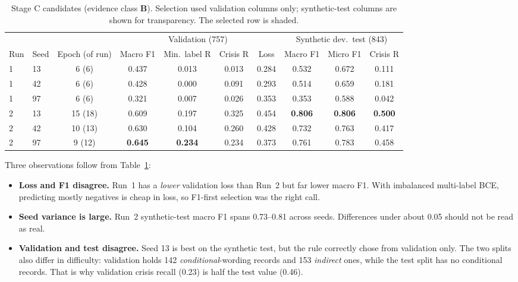 \documentclass[11pt,a4paper]{article}
\newcommand{\evB}{\textsf{\textbf{B}}}
\begin{document}
\begin{table}[!htbp]
\centering\footnotesize
\caption{Stage C candidates (evidence class \evB). Selection used validation columns only; synthetic-test columns are shown for transparency. The selected row is shaded.}
\label{tab:stageC}
\begin{tabular}{@{}llcccccccc@{}}
\toprule
& & & \multicolumn{4}{c}{Validation (757)} & \multicolumn{3}{c}{Synthetic dev.\ test (843)} \\
\cmidrule(lr){4-7}\cmidrule(l){8-10}
Run & Seed & Epoch (of run) & Macro F1 & Min.\ label R & Crisis R & Loss & Macro F1 & Micro F1 & Crisis R \\
\midrule
1 & 13 & 6 (6) & 0.437 & 0.013 & 0.013 & 0.284 & 0.532 & 0.672 & 0.111 \\
1 & 42 & 6 (6) & 0.428 & 0.000 & 0.091 & 0.293 & 0.514 & 0.659 & 0.181 \\
1 & 97 & 6 (6) & 0.321 & 0.007 & 0.026 & 0.353 & 0.353 & 0.588 & 0.042 \\
2 & 13 & 15 (18) & 0.609 & 0.197 & 0.325 & 0.454 & \textbf{0.806} & \textbf{0.806} & \textbf{0.500} \\
2 & 42 & 10 (13) & 0.630 & 0.104 & 0.260 & 0.428 & 0.732 & 0.763 & 0.417 \\
\rowcolor{selrow} 2 & 97 & 9 (12) & \textbf{0.645} & \textbf{0.234} & 0.234 & 0.373 & 0.761 & 0.783 & 0.458 \\
\bottomrule
\end{tabular}
\end{table}

\noindent Three observations follow from Table~\ref{tab:stageC}:
\begin{itemize}
  \item \textbf{Loss and F1 disagree.} Run~1 has a \emph{lower} validation loss than Run~2 but far
        lower macro F1. With imbalanced multi-label BCE, predicting mostly negatives is cheap in
        loss, so F1-first selection was the right call.
  \item \textbf{Seed variance is large.} Run~2 synthetic-test macro F1 spans 0.73--0.81 across
        seeds. Differences under about 0.05 should not be read as real.
  \item \textbf{Validation and test disagree.} Seed 13 is best on the synthetic test, but the rule
        correctly chose from validation only. The two splits also differ in difficulty: validation
        holds 142 \emph{conditional}-wording records and 153 \emph{indirect} ones, while the test
        split has no conditional records. That is why validation crisis recall (0.23) is half the
        test value (0.46).
\end{itemize}
\end{document}

